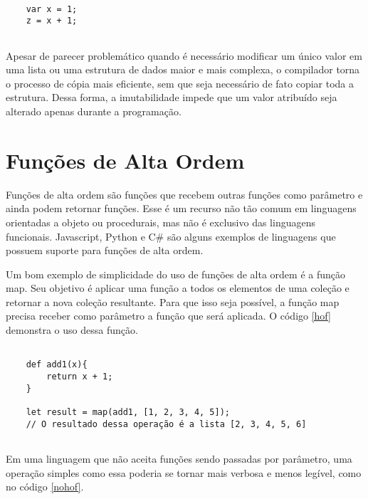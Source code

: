 \begin{lstlisting}[caption={Exemplo de Código Imutável},label=imutablevar]

    var x = 1;
    z = x + 1;


\end{lstlisting}

Apesar de parecer problemático quando é necessário 
modificar um único valor em uma lista ou uma estrutura 
de dados maior e mais complexa, o compilador torna o 
processo de cópia mais eficiente, sem que seja 
necessário de fato copiar toda a estrutura\cite{functionalscala}. 
Dessa forma, a imutabilidade impede que um valor 
atribuído seja alterado apenas durante a 
programação.


\section{Funções de Alta Ordem}

Funções de alta ordem são funções que recebem 
outras funções como parâmetro e ainda podem 
retornar funções\cite{realworldhaskell, functionalscala}. 
Esse é um recurso 
não tão comum em linguagens orientadas a 
objeto ou procedurais, mas não é exclusivo das 
linguagens funcionais. Javascript\cite{eloquentjs}, 
Python\cite{denerocomposing} e C\#\cite{buonannofunctcsharp}
são alguns exemplos de linguagens que possuem suporte 
para funções de alta ordem.

Um bom exemplo de simplicidade do uso de 
funções de alta ordem é a função map\cite{hofscala}. Seu objetivo 
é aplicar uma função a todos os elementos de uma 
coleção e retornar a nova coleção resultante. 
Para que isso seja possível, a função map precisa 
receber como parâmetro a função que será aplicada. 
O código \ref{hof} demonstra o uso dessa função.

\begin{lstlisting}[caption={Exemplo de Função de Alta Ordem},label=hof]

    def add1(x){
        return x + 1;
    }

    let result = map(add1, [1, 2, 3, 4, 5]);
    // O resultado dessa operação é a lista [2, 3, 4, 5, 6]
        

\end{lstlisting}

Em uma linguagem que não aceita funções sendo 
passadas por parâmetro, uma operação simples como 
essa poderia se tornar mais verbosa e menos legível, 
como no código \ref{nohof}.

